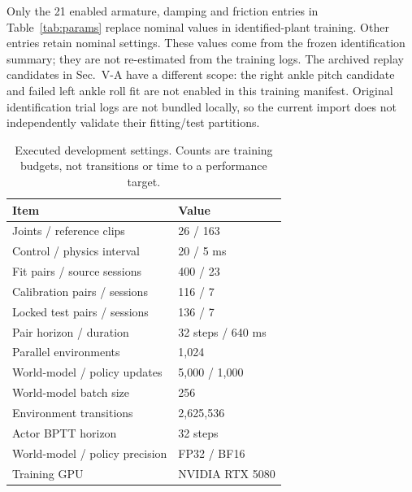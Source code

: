 \documentclass[letterpaper,10pt,conference]{ieeeconf}
\begin{document}
Only the 21 enabled armature, damping and friction entries in Table~\ref{tab:params} replace nominal values in identified-plant training. Other entries retain nominal settings. These values come from the frozen identification summary; they are not re-estimated from the training logs. The archived replay candidates in Sec.~V-A have a different scope: the right ankle pitch candidate and failed left ankle roll fit are not enabled in this training manifest. Original identification trial logs are not bundled locally, so the current import does not independently validate their fitting/test partitions.

\begin{table}[t]
\centering
\caption{Executed development settings. Counts are training budgets, not transitions or time to a performance target.}
\label{tab:settings}
\small
\setlength{\tabcolsep}{3pt}
\begin{tabular}{@{}ll@{}}
\toprule
Item & Value \\
\midrule
Joints / reference clips & 26 / 163 \\
Control / physics interval & 20 / 5 ms \\
Fit pairs / source sessions & 400 / 23 \\
Calibration pairs / sessions & 116 / 7 \\
Locked test pairs / sessions & 136 / 7 \\
Pair horizon / duration & 32 steps / 640 ms \\
Parallel environments & 1,024 \\
World-model / policy updates & 5,000 / 1,000 \\
World-model batch size & 256 \\
Environment transitions & 2,625,536 \\
Actor BPTT horizon & 32 steps \\
World-model / policy precision & FP32 / BF16 \\
Training GPU & NVIDIA RTX 5080 \\
\bottomrule
\end{tabular}
\end{table}
\end{document}
